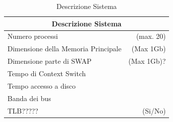 \newpage	
	
\begin{table}[h]
	\begin{center}
		  \begin{tabular}{|p{}|r|}
		 \hline
			\multicolumn{2}{|c|}{\textbf{Descrizione Sistema}}\\
		 \hline
		Numero processi & (max. 20)\\
		Dimensione della Memoria Principale & (Max 1Gb) \\
		Dimensione parte di SWAP & (Max 1Gb)? \\
		Tempo di Context Switch & \\
		Tempo accesso a disco & \\
		Banda dei bus & \\
		TLB????? & (Si/No)\\
		\hline %
		\end{tabular}
	\caption{Descrizione Sistema} %
	\label{tabdescrsistema}
	\end{center}	
\end{table}


